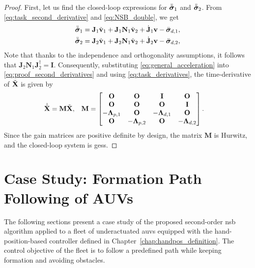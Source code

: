 \begin{proof}
    First, let us find the closed-loop expressions for $\ddot{\Tilde{\bm{\sigma}}}_1$ and $\ddot{\Tilde{\bm{\sigma}}}_2$.
    From \eqref{eq:task_second_derivative} and \eqref{eq:NSB_double}, we get
    \begin{subequations}\label{eq:proof_second_derivatives}
        \begin{align}
            \ddot{\Tilde{\bm{\sigma}}}_1 &= \mathbf{J}_1\dot{\mathbf{v}}_1 + \mathbf{J}_1\mathbf{N}_1\dot{\mathbf{v}}_2 + \dot{\mathbf{J}}_1\mathbf{v} - \ddot{\bm{\sigma}}_{d, 1}, \\
            \ddot{\Tilde{\bm{\sigma}}}_2 &= \mathbf{J}_2\dot{\mathbf{v}}_1 + \mathbf{J}_2\mathbf{N}_1\dot{\mathbf{v}}_2 + \dot{\mathbf{J}}_2\mathbf{v} - \ddot{\bm{\sigma}}_{d, 2}, 
        \end{align}
    \end{subequations}
    Note that thanks to the independence and orthogonality assumptions, it follows that $\mathbf{J}_2 \mathbf{N}_1 \mathbf{J}_2^{\dagger} = \mathbf{I}$.
    Consequently, substituting \eqref{eq:general_acceleration} into \eqref{eq:proof_second_derivatives} and using \eqref{eq:task_derivatives}, the time-derivative of $\Tilde{\mathbf{X}}$ is given by
    \begin{align}
        \dot{\Tilde{\mathbf{X}}} &= \mathbf{M}\Tilde{\mathbf{X}}, &
        \mathbf{M} &= 
        \begin{bmatrix}
            \mathbf{O} & \mathbf{O} & \mathbf{I} & \mathbf{O} \\
            \mathbf{O} & \mathbf{O} & \mathbf{O} & \mathbf{I} \\
            -\mathbf{\Lambda}_{p,1} & \mathbf{O} & -\mathbf{\Lambda}_{d,1} & \mathbf{O} \\
            \mathbf{O} & -\mathbf{\Lambda}_{p,2} & \mathbf{O} & -\mathbf{\Lambda}_{d,2}
        \end{bmatrix}.
    \end{align}
    Since the gain matrices are positive definite by design, the matrix $\mathbf{M}$ is Hurwitz, and the closed-loop system is \glspl{ges}.
\end{proof}

\section{Case Study: Formation Path Following of AUVs}\label{sec:case_study}
The following sections present a case study of the proposed second-order \gls{nsb} algorithm applied to a fleet of underactuated \glspl{auv} equipped with the hand-position-based controller defined in Chapter~\ref{chap:handpos_definition}. The control objective of the fleet is to follow a predefined path while keeping formation and avoiding obstacles.

